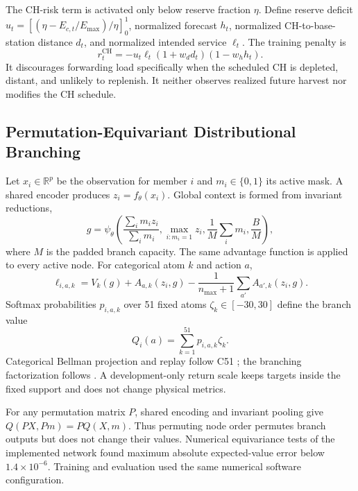 \documentclass[journal]{IEEEtran}
\newcommand{\R}{\mathbb{R}}
\begin{document}
The CH-risk term is activated only below reserve fraction $\eta$. Define
reserve deficit $u_t=[(\eta-E_{c,t}/E_{\max})/\eta]_0^1$, normalized forecast
$h_t$, normalized CH-to-base-station distance $d_t$, and normalized intended
service $\ell_t$. The training penalty is
\begin{equation}
 r_t^{\mathrm{CH}}=-u_t\ell_t(1+w_d d_t)(1-w_h h_t).
 \label{eq:risk}
\end{equation}
It discourages forwarding load specifically when the scheduled CH is depleted,
distant, and unlikely to replenish. It neither observes realized future
harvest nor modifies the CH schedule.

\subsection{Permutation-Equivariant Distributional Branching}

Let $x_i\in\R^p$ be the observation for member $i$ and $m_i\in\{0,1\}$ its
active mask. A shared encoder produces $z_i=f_\theta(x_i)$. Global context is
formed from invariant reductions,
\begin{equation}
 g=\psi_\theta\!\left(
 \frac{\sum_i m_i z_i}{\sum_i m_i},
 \max_{i:m_i=1}z_i,
 \frac{1}{M}\sum_i m_i,
 \frac{B}{M}\right),
 \label{eq:set}
\end{equation}
where $M$ is the padded branch capacity. The same advantage function is applied
to every active node. For categorical atom $k$ and action $a$,
\begin{equation}
 \ell_{i,a,k}=V_k(g)+A_{a,k}(z_i,g)
 -\frac{1}{n_{\max}+1}\sum_{a'}A_{a',k}(z_i,g).
 \label{eq:dueling}
\end{equation}
Softmax probabilities $p_{i,a,k}$ over 51 fixed atoms $\zeta_k\in[-30,30]$
define the branch value
\begin{equation}
 Q_i(a)=\sum_{k=1}^{51}p_{i,a,k}\zeta_k.
 \label{eq:c51}
\end{equation}
Categorical Bellman projection and replay follow C51
\cite{bellemare2017c51}; the branching factorization follows
\cite{tavakoli2018branching}. A development-only return scale keeps targets
inside the fixed support and does not change physical metrics.

For any permutation matrix $P$, shared encoding and invariant pooling give
$Q(PX, Pm)=P Q(X,m)$. Thus permuting node order permutes branch outputs but
does not change their values. Numerical equivariance tests of the implemented
network found maximum absolute expected-value error below
$1.4\times10^{-6}$. Training and evaluation used the same numerical software
configuration.
\end{document}
